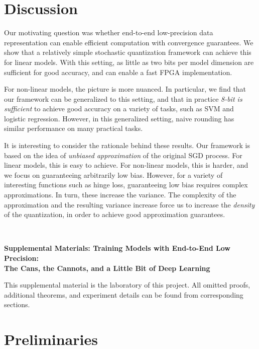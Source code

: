 \documentclass{article}
\begin{document}
\section{Discussion}
\label{sec:conclusions}

Our motivating question was whether end-to-end low-precision data representation can enable efficient computation with convergence guarantees. 
We show that a relatively simple stochastic quantization framework can achieve this for linear models. 
With this setting, as little as two bits per model dimension are sufficient for good accuracy, and can enable a fast FPGA implementation.  

For non-linear models, the picture is more nuanced. 
In particular, we find that our framework can be generalized to this setting, and that in practice \emph{8-bit is sufficient} to achieve good accuracy on a variety of tasks, such as SVM and logistic regression. 
However, in this generalized setting, naive rounding has similar performance on many practical tasks. 

It is interesting to consider the rationale behind these results. Our framework is based on the idea of \emph{unbiased approximation} of the original SGD process. For linear models, this is easy to achieve. For non-linear models, this is harder, and we focus on guaranteeing arbitrarily low bias. 
However, for a variety of interesting functions such as hinge loss, guaranteeing low bias requires complex approximations. In turn, these increase the variance. The complexity of the approximation and the resulting variance increase force us to increase the \emph{density} of the quantization, in order to achieve good approximation guarantees. 

\newpage~\newpage~\newpage~

\begin{center}
\textbf{\large Supplemental Materials: Training Models with End-to-End Low Precision:\\
The Cans, the Cannots, and a Little Bit of Deep Learning}
\end{center}

This supplemental material is the laboratory of this project. All omitted proofs, additional theorems, and experiment details can be found from corresponding sections.

\section{Preliminaries}
\end{document}
